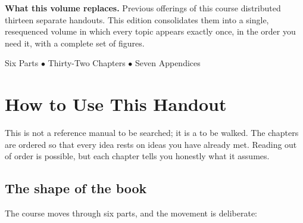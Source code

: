 \begin{center}
\vspace{1.4cm}

\begin{tcolorbox}[enhanced, width=0.86\textwidth, colback=lightbg,
  colframe=primary, boxrule=0pt, leftrule=4pt, arc=2pt, top=6pt, bottom=6pt]
\small
\textbf{\color{primary}What this volume replaces.} Previous offerings of this course
distributed thirteen separate handouts. This edition consolidates them into a
single, resequenced volume in which every topic appears exactly once, in the
order you need it, with a complete set of figures.
\end{tcolorbox}

\vspace{1.2cm}
{\small\color{gray!60!black}Six Parts $\bullet$ Thirty-Two Chapters $\bullet$ Seven Appendices}
\vspace{1cm}
\end{center}

\newpage

\chapter*{How to Use This Handout}

This is not a reference manual to be searched; it is a  to be walked.
The chapters are ordered so that every idea rests on ideas you have already met.
Reading out of order is possible, but each chapter tells you honestly what it
assumes.

\section*{The shape of the book}

The course moves through six parts, and the movement is deliberate:

